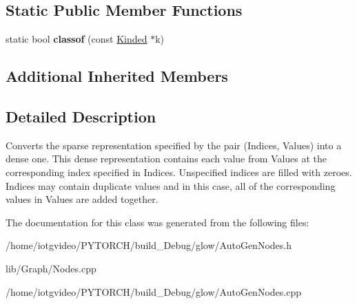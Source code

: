 \subsection*{Static Public Member Functions}
\begin{DoxyCompactItemize}
\item 
\mbox{\label{classglow_1_1_sparse_to_dense_node_adabb75cb0175a80cf0044e0b7feedb55}} 
static bool {\bfseries classof} (const \hyperlink{classglow_1_1_kinded}{Kinded} $\ast$k)
\end{DoxyCompactItemize}
\subsection*{Additional Inherited Members}


\subsection{Detailed Description}
Converts the sparse representation specified by the pair (Indices, Values) into a dense one. This dense representation contains each value from Values at the corresponding index specified in Indices. Unspecified indices are filled with zeroes. Indices may contain duplicate values and in this case, all of the corresponding values in Values are added together. 

The documentation for this class was generated from the following files\+:\begin{DoxyCompactItemize}
\item 
/home/iotgvideo/\+P\+Y\+T\+O\+R\+C\+H/build\+\_\+\+Debug/glow/Auto\+Gen\+Nodes.\+h\item 
lib/\+Graph/Nodes.\+cpp\item 
/home/iotgvideo/\+P\+Y\+T\+O\+R\+C\+H/build\+\_\+\+Debug/glow/Auto\+Gen\+Nodes.\+cpp\end{DoxyCompactItemize}
